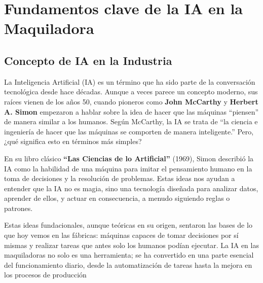 \chapter{Fundamentos clave de la IA en la
Maquiladora}\label{fundamentos-clave-de-la-ia-en-la-maquiladora}

\section{Concepto de IA en la
Industria}\label{concepto-de-ia-en-la-industria}

La Inteligencia Artificial (IA) es un término que ha sido parte de la
conversación tecnológica desde hace décadas. Aunque a veces parece un
concepto moderno, sus raíces vienen de los años 50, cuando pioneros como
\textbf{John McCarthy} y \textbf{Herbert A. Simon} empezaron a hablar
sobre la idea de hacer que las máquinas ``piensen'' de manera similar a
los humanos. Según McCarthy, la IA se trata de ``la ciencia e ingeniería
de hacer que las máquinas se comporten de manera inteligente.'' Pero,
¿qué significa esto en términos más simples?

En su libro clásico \textbf{``Las Ciencias de lo Artificial''} (1969),
Simon describió la IA como la habilidad de una máquina para imitar el
pensamiento humano en la toma de decisiones y la resolución de
problemas. Estas ideas nos ayudan a entender que la IA no es magia, sino
una tecnología diseñada para analizar datos, aprender de ellos, y actuar
en consecuencia, a menudo siguiendo reglas o patrones.

Estas ideas fundacionales, aunque teóricas en su origen, sentaron las
bases de lo que hoy vemos en las fábricas: máquinas capaces de tomar
decisiones por sí mismas y realizar tareas que antes solo los humanos
podían ejecutar. La IA en las maquiladoras no solo es una herramienta;
se ha convertido en una parte esencial del funcionamiento diario, desde
la automatización de tareas hasta la mejora en los procesos de
producción


